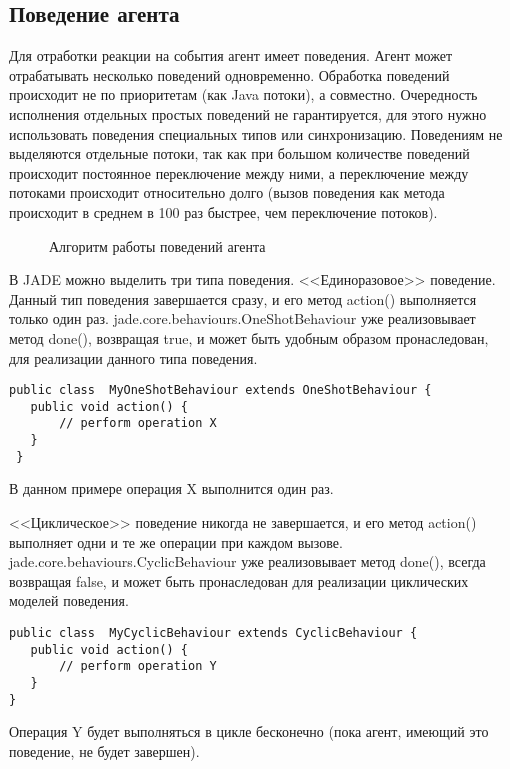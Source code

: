 \subsection{Поведение агента}
Для отработки реакции на события агент имеет поведения. Агент может отрабатывать несколько поведений одновременно. Обработка поведений происходит не по приоритетам (как Java потоки), а совместно. Очередность исполнения отдельных простых поведений не гарантируется, для этого нужно использовать поведения специальных типов или синхронизацию.
Поведениям не выделяются отдельные потоки, так как при большом количестве поведений происходит постоянное переключение между ними, а переключение между потоками происходит относительно долго (вызов поведения как метода происходит в среднем в 100 раз быстрее, чем переключение потоков).
\begin{figure}[h!]
\caption{Алгоритм работы поведений агента}
\label{2:behs}
\end{figure}
В JADE можно выделить три типа поведения.
<<Единоразовое>> поведение. Данный тип поведения завершается сразу, и его метод action() выполняется только один раз. jade.core.behaviours.OneShotBehaviour уже реализовывает метод done(), возвращая true, и может быть удобным образом пронаследован, для реализации данного типа поведения.
\begin{verbatim}
public class  MyOneShotBehaviour extends OneShotBehaviour { 
   public void action() { 
       // perform operation X 
   } 
 }
\end{verbatim}
В данном примере операция X выполнится один раз.

<<Циклическое>> поведение никогда не завершается, и его метод action() выполняет одни и те же операции при каждом вызове. jade.core.behaviours.CyclicBehaviour уже реализовывает метод done(), всегда возвращая false, и может быть пронаследован для реализации циклических моделей поведения.
\begin{verbatim}
public class  MyCyclicBehaviour extends CyclicBehaviour { 
   public void action() { 
       // perform operation Y 
   } 
}
\end{verbatim}
Операция Y будет выполняться в цикле бесконечно (пока агент, имеющий это поведение, не будет завершен).

